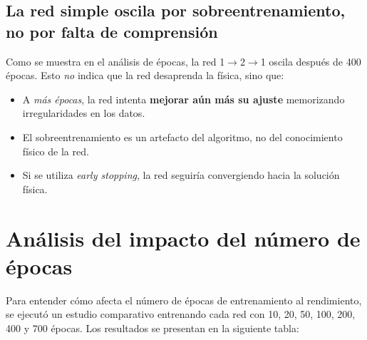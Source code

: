 \documentclass[11pt]{article}
\begin{document}
	\subsection{La red simple oscila por sobreentrenamiento, no por falta de comprensión}
	Como se muestra en el análisis de épocas, la red 1$\rightarrow$2$\rightarrow$1 oscila después de 400 épocas. Esto \textit{no} indica que la red desaprenda la física, sino que:
	\begin{itemize}
		\item A \textit{más épocas}, la red intenta \textbf{mejorar aún más su ajuste} memorizando irregularidades en los datos.
		\item El sobreentrenamiento es un artefacto del algoritmo, no del conocimiento físico de la red.
		\item Si se utiliza \textit{early stopping}, la red seguiría convergiendo hacia la solución física.
	\end{itemize}
	
	\section{Análisis del impacto del número de épocas}
	Para entender cómo afecta el número de épocas de entrenamiento al rendimiento, se ejecutó un estudio comparativo entrenando cada red con 10, 20, 50, 100, 200, 400 y 700 épocas. Los resultados se presentan en la siguiente tabla:
	
\end{document}
